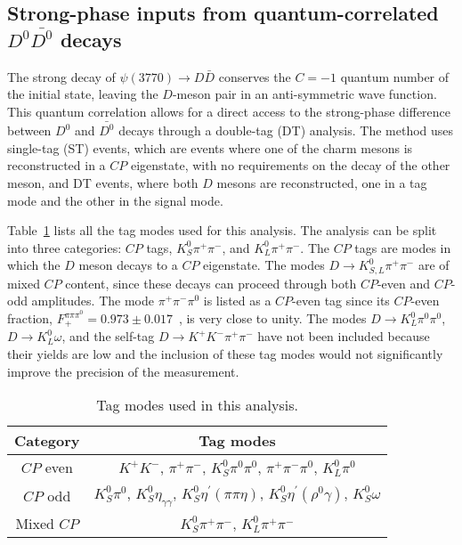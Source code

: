 \documentclass[12pt, a4paper, notitlepage, onecolumn]{article}
\begin{document}
\subsection{Strong-phase inputs from quantum-correlated \texorpdfstring{$D^0\bar{D^0}$}{DD} decays}
\noindent The strong decay of $\psi(3770)\to D\bar{D}$ conserves the $C = -1$ quantum number of the initial state, leaving the $D$-meson pair in an anti-symmetric wave function. This quantum correlation allows for a direct access to the strong-phase difference between $D^0$ and $\bar{D^0}$ decays through a double-tag (DT) analysis. The method uses single-tag (ST) events, which are events where one of the charm mesons is reconstructed in a $C\!P$ eigenstate, with no requirements on the decay of the other meson, and DT events, where both $D$ mesons are reconstructed, one in a tag mode and the other in the signal mode.

Table~\ref{table:Tag_modes} lists all the tag modes used for this analysis. The analysis can be split into three categories: $C\!P$ tags, $K_S^0\pi^+\pi^-$, and $K_L^0\pi^+\pi^-$. The $C\!P$ tags are modes in which the $D$ meson decays to a $C\!P$ eigenstate. The modes $D\to K_{S, L}^0\pi^+\pi^-$ are of mixed $C\!P$ content, since these decays can proceed through both $C\!P$-even and $C\!P$-odd amplitudes. The mode $\pi^+\pi^-\pi^0$ is listed as a $C\!P$-even tag since its $C\!P$-even fraction, $F_+^{\pi\pi\pi^0} = 0.973 \pm 0.017$~\cite{cite:pipipi0_CPfraction}, is very close to unity. The modes $D\to K_L^0\pi^0\pi^0$, $D\to K_L^0\omega$, and the self-tag $D\to K^+K^-\pi^+\pi^-$ have not been included because their yields are low and the inclusion of these tag modes would not significantly improve the precision of the measurement.

\begin{table}[htb]
    \centering
    \caption{Tag modes used in this analysis.}
    \label{table:Tag_modes}
    \begin{tabular}{cc}
        \hline
        Category     & Tag modes \\
        \hline
        $C\!P$ even  & $K^+K^-$, $\pi^+\pi^-$, $K_S^0\pi^0\pi^0$, $\pi^+\pi^-\pi^0$, $K_L^0\pi^0$ \\
        $C\!P$ odd   & $K_S^0\pi^0$, $K_S^0\eta_{\gamma\gamma}$, $K_S^0\eta^\prime(\pi\pi\eta)$, $K_S^0\eta^\prime(\rho^0\gamma)$, $K_S^0\omega$ \\
        Mixed $C\!P$ & $K_S^0\pi^+\pi^-$, $K_L^0\pi^+\pi^-$ \\
        \hline
    \end{tabular}
\end{table}
\end{document}
